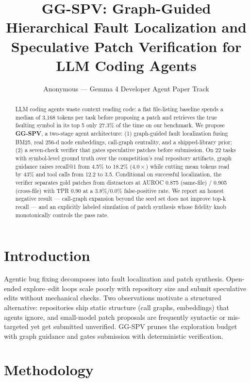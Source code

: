 \documentclass[10pt]{article}
\title{GG-SPV: Graph-Guided Hierarchical Fault Localization and\\Speculative Patch Verification for LLM Coding Agents}
\author{Anonymous --- Gemma 4 Developer Agent Paper Track}
\date{}
\begin{document}
\maketitle

\begin{abstract}
LLM coding agents waste context reading code: a flat file-listing baseline spends a median of 3{,}168 tokens per task before proposing a patch and retrieves the true faulting symbol in its top 5 only 27.3\% of the time on our benchmark. We propose \textbf{GG-SPV}, a two-stage agent architecture: (1) graph-guided fault localization fusing BM25, real 256-d node embeddings, call-graph centrality, and a shipped-library prior; (2) a seven-check verifier that gates speculative patches before submission. On 22 tasks with symbol-level ground truth over the competition's real repository artifacts, graph guidance raises recall@1 from 4.5\% to 18.2\% ($4.0\times$) while cutting mean tokens read by 43\% and tool calls from 12.2 to 3.5. Conditional on successful localization, the verifier separates gold patches from distractors at AUROC 0.875 (same-file) / 0.905 (cross-file) with TPR 0.90 at a 3.8\%/0.0\% false-positive rate. We report an honest negative result --- call-graph expansion beyond the seed set does not improve top-k recall --- and an explicitly labeled simulation of patch synthesis whose fidelity knob monotonically controls the pass rate.
\end{abstract}

\section{Introduction}
Agentic bug fixing decomposes into fault localization and patch synthesis. Open-ended explore--edit loops scale poorly with repository size and submit speculative edits without mechanical checks. Two observations motivate a structured alternative: repositories ship static structure (call graphs, embeddings) that agents ignore, and small-model patch proposals are frequently syntactic or mis-targeted yet get submitted unverified. GG-SPV prunes the exploration budget with graph guidance and gates submission with deterministic verification.

\section{Methodology}
\end{document}
